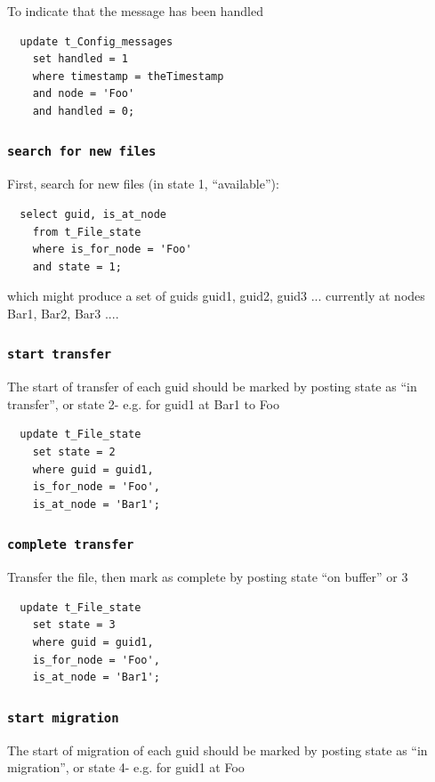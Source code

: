 \documentclass{cmspaper}
\begin{document}
To indicate that the message has been handled

{\small\begin{verbatim}
  update t_Config_messages
  	set handled = 1
  	where timestamp = theTimestamp
  	and node = 'Foo'
  	and handled = 0;
\end{verbatim}}

\subsubsection{\textbf{\texttt{search for new files}}}
First, search for new files (in state 1, ``available''):

{\small\begin{verbatim}
  select guid, is_at_node
    from t_File_state
    where is_for_node = 'Foo'
    and state = 1;
\end{verbatim}}

which might produce a set of guids {guid1, guid2, guid3 ...} currently at nodes {Bar1, Bar2, Bar3 ...}. 

\subsubsection{\textbf{\texttt{start transfer}}}
The start of transfer of each guid should be marked by posting state as ``in transfer'', or state 2- e.g. for guid1 at Bar1 to Foo

{\small\begin{verbatim}
  update t_File_state
    set state = 2
    where guid = guid1,
    is_for_node = 'Foo',
    is_at_node = 'Bar1';
  \end{verbatim}}

\subsubsection{\textbf{\texttt{complete transfer}}}
Transfer the file, then mark as complete by posting state ``on buffer'' or 3

{\small\begin{verbatim}
  update t_File_state
    set state = 3
    where guid = guid1,
    is_for_node = 'Foo',
    is_at_node = 'Bar1';
\end{verbatim}}

\subsubsection{\textbf{\texttt{start migration}}}
The start of migration of each guid should be marked by posting state as ``in migration'', or state 4- e.g. for guid1 at Foo
\end{document}
